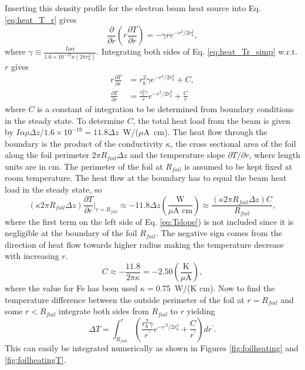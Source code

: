\documentclass[12pt]{article}
\begin{document}
Inserting this density profile for the electron beam heat source into Eq. \ref{eq:heat_T_r} gives
\begin{equation}
\label{eq:heat_Tr_simp}
\frac{\partial}{\partial r}\left(r\frac{\partial T}{\partial r}\right)=-\gamma re^{-r^2/2r_b^2},
\end{equation} 
where $\gamma\equiv\frac{I\rho\alpha}{1.6\times 10^{-19} \kappa\left(2\pi r_{b}^2\right)}$.
Integrating both sides of Eq. \ref{eq:heat_Tr_simp} w.r.t. $r$ gives
\begin{align}
r\frac{\partial T}{\partial r}&=r_b^2\gamma e^{-r^2/2r_b^2}+C,\\
\label{eq:Tslope}
\frac{\partial T}{\partial r}&=\frac{r_b^2\gamma}{r} e^{-r^2/2r_b^2}+\frac{C}{r}
\end{align} 
where $C$ is a constant of integration to be determined from boundary conditions in the steady state. To determine $C$, the total heat load from the beam is given by $I\alpha\rho\Delta z/1.6\times10^{-19}=11.8\Delta z$~W/($\mu$A~cm). The heat flow through the boundary is the product of the conductivity $\kappa$, the cross sectional area of the foil along the foil perimeter $2\pi R_{foil}\Delta z$ and the temperature slope $\partial T /\partial r$, where  length units are in cm. The perimeter of the foil at $R_{foil}$ is assumed to be kept fixed at room temperature. The heat flow at the boundary has to equal the beam heat load in the steady state, so 
\[
\left(\kappa2\pi R_{foil}\Delta z\right) \frac{\partial T}{\partial r}|_{r=R_{foil}}\approx-11.8\Delta z\left(\frac{\textrm{W}}{\mu \textrm{A cm}}\right)\approx\frac{\left(\kappa2\pi R_{foil}\Delta z\right) C}{R_{foil}},
\]
where the first term on the left side of Eq. \ref{eq:Tslope}) is not included since it is negligible at the boundary of the foil $R_{foil}$. The negative sign comes from the direction of heat flow towards higher radius making the temperature decrease with increasing $r$.
\[
C\approx-\frac{11.8}{2\pi\kappa}=-2.50\left(\frac{\textrm{K}}{\mu\textrm{A}}\right),
\]
where the value for Fe has been used $\kappa=$0.75~W/(K cm). Now to find the temperature difference between the outside perimeter of the foil at $r=R_{foil}$ and some $r<R_{foil}$ integrate both sides from $R_{foil}$ to $r$ yielding
\begin{equation}
\label{eq:dT}
\Delta T = \int_{R_{foil}}^r \left(\frac{r_b^2\gamma}{r^{\prime}} e^{-r^{\prime 2}/2r_b^2}+\frac{C}{r^{\prime}}\right)dr^{\prime}.
\end{equation}
This can easily be integrated numerically as shown in Figures  \ref{fig:foilheating} and \ref{fig:foilheatingT}.
\end{document}
